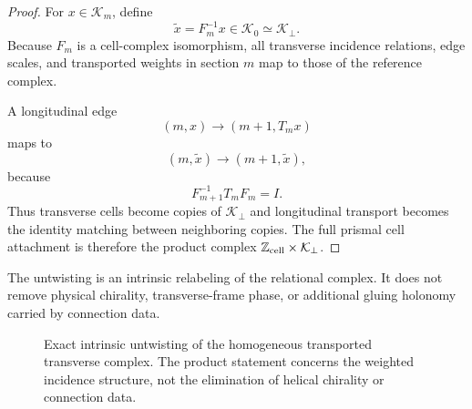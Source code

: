\documentclass[11pt]{article}
\newcommand{\Z}{\mathbb{Z}}
\newcommand{\cK}{\mathcal{K}}
\begin{document}
\begin{proof}
For \(x\in\cK_m\), define
\[
\widetilde x=F_m^{-1}x\in\cK_0\simeq\cK_\perp.
\]
Because \(F_m\) is a cell-complex isomorphism, all transverse incidence relations, edge scales, and transported weights in section \(m\) map to those of the reference complex.

A longitudinal edge
\[
(m,x)\longrightarrow(m+1,T_mx)
\]
maps to
\[
(m,\widetilde x)\longrightarrow(m+1,\widetilde x),
\]
because
\[
F_{m+1}^{-1}T_mF_m
=
I.
\]
Thus transverse cells become copies of \(\cK_\perp\) and longitudinal transport becomes the identity matching between neighboring copies. The full prismal cell attachment is therefore the product complex \(\Z_{\rm cell}\times\cK_\perp\).
\end{proof}

The untwisting is an intrinsic relabeling of the relational complex. It does not remove physical chirality, transverse-frame phase, or additional gluing holonomy carried by connection data.

\begin{figure}[t]
\centering
{}
\caption{Exact intrinsic untwisting of the homogeneous transported transverse complex. The product statement concerns the weighted incidence structure, not the elimination of helical chirality or connection data.}
\label{fig:untwist}
\end{figure}
\end{document}
